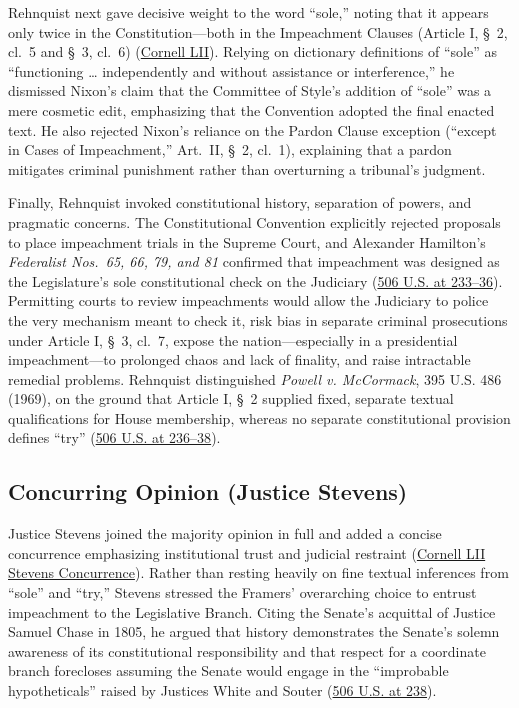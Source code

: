 \documentclass[12pt]{article}
\begin{document}
Rehnquist next gave decisive weight to the word ``sole,'' noting that it appears only twice in the Constitution---both in the Impeachment Clauses (Article I, \S~2, cl.\ 5 and \S~3, cl.\ 6) (\href{https://www.law.cornell.edu/supct/html/91-740.ZO.html}{Cornell LII}). Relying on dictionary definitions of ``sole'' as ``functioning \dots{} independently and without assistance or interference,'' he dismissed Nixon's claim that the Committee of Style's addition of ``sole'' was a mere cosmetic edit, emphasizing that the Convention adopted the final enacted text. He also rejected Nixon's reliance on the Pardon Clause exception (``except in Cases of Impeachment,'' Art.\ II, \S~2, cl.\ 1), explaining that a pardon mitigates criminal punishment rather than overturning a tribunal's judgment.

Finally, Rehnquist invoked constitutional history, separation of powers, and pragmatic concerns. The Constitutional Convention explicitly rejected proposals to place impeachment trials in the Supreme Court, and Alexander Hamilton's \textit{Federalist Nos.\ 65, 66, 79, and 81} confirmed that impeachment was designed as the Legislature's sole constitutional check on the Judiciary (\href{https://supreme.justia.com/cases/federal/us/506/224/}{506 U.S. at 233--36}). Permitting courts to review impeachments would allow the Judiciary to police the very mechanism meant to check it, risk bias in separate criminal prosecutions under Article I, \S~3, cl.\ 7, expose the nation---especially in a presidential impeachment---to prolonged chaos and lack of finality, and raise intractable remedial problems. Rehnquist distinguished \textit{Powell v. McCormack}, 395 U.S. 486 (1969), on the ground that Article I, \S~2 supplied fixed, separate textual qualifications for House membership, whereas no separate constitutional provision defines ``try'' (\href{https://supreme.justia.com/cases/federal/us/506/224/}{506 U.S. at 236--38}).

\subsection{Concurring Opinion (Justice Stevens)}

Justice Stevens joined the majority opinion in full and added a concise concurrence emphasizing institutional trust and judicial restraint (\href{https://www.law.cornell.edu/supct/html/91-740.ZC.html}{Cornell LII Stevens Concurrence}). Rather than resting heavily on fine textual inferences from ``sole'' and ``try,'' Stevens stressed the Framers' overarching choice to entrust impeachment to the Legislative Branch. Citing the Senate's acquittal of Justice Samuel Chase in 1805, he argued that history demonstrates the Senate's solemn awareness of its constitutional responsibility and that respect for a coordinate branch forecloses assuming the Senate would engage in the ``improbable hypotheticals'' raised by Justices White and Souter (\href{https://supreme.justia.com/cases/federal/us/506/224/}{506 U.S. at 238}).
\end{document}
